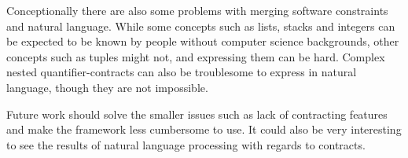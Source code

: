 Conceptionally there are also some problems with merging software constraints and natural language.
While some concepts such as lists, stacks and integers can be expected to be known by people without computer science backgrounds, other concepts such as tuples might not, and expressing them can be hard.
Complex nested quantifier-contracts can also be troublesome to express in natural language, though they are not impossible.

Future work should solve the smaller issues such as lack of contracting features and make the framework less cumbersome to use.
It could also be very interesting to see the results of natural language processing with regards to contracts.
